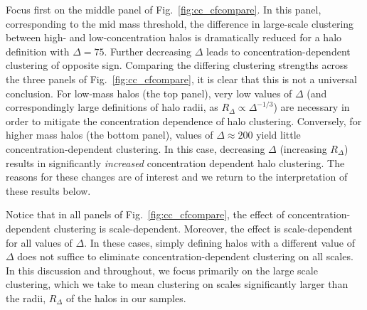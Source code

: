 \documentclass[usenatbib]{mnras}
\begin{document}
Focus first on the middle panel of Fig.~\ref{fig:cc_cfcompare}. In this panel, corresponding to the 
mid mass threshold, the difference in large-scale clustering between high- and low-concentration halos 
is dramatically reduced for a halo definition with $\Delta=75$. Further decreasing $\Delta$ leads to
concentration-dependent clustering of opposite sign. Comparing the differing clustering 
strengths across the three panels of Fig.~\ref{fig:cc_cfcompare}, it is clear that this is not a universal
conclusion. For low-mass halos (the top panel), very low values of $\Delta$ (and correspondingly large definitions of halo radii,
as $R_{\Delta} \propto \Delta^{-1/3}$) are necessary in order to mitigate the concentration dependence of halo
clustering. Conversely, for higher
mass halos (the bottom panel), values of $\Delta \approx 200$ yield little concentration-dependent clustering. In
this case, decreasing $\Delta$ (increasing $R_{\Delta}$) results in significantly {\em increased} concentration
dependent halo clustering. The reasons for these changes are of interest and we return to the interpretation of 
these results below.

Notice that in all panels of Fig.~\ref{fig:cc_cfcompare}, the effect of concentration-dependent clustering is
scale-dependent. Moreover, the effect is scale-dependent for all values of $\Delta$. In these cases, simply
defining halos with a different value of $\Delta$ does not suffice to eliminate concentration-dependent
clustering on all scales. In this discussion and throughout, we focus primarily on the large scale clustering,
which we take to mean clustering on scales significantly larger than the radii, $R_{\Delta}$ of the halos in our
samples.
\end{document}
